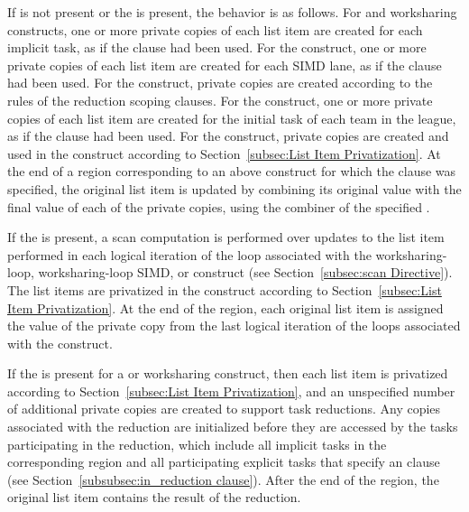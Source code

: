 If  is not present or the 
 is present, the behavior is
as follows. For  and worksharing constructs, one or more
private copies of each list item are created for each implicit task, as if the
 clause had been used. For the  construct, one or
more private copies of each list item are created for each SIMD lane, as if the
 clause had been used.  For the  construct,
private copies are created according to the rules of the reduction scoping
clauses.  For the  construct, one or more private copies of each
list item are created for the initial task of each team in the league, as if
the  clause had been used. For the  construct,
private copies are created and used in the construct according to
Section~\ref{subsec:List Item Privatization}. At the end of a region
corresponding to an above construct for which the  clause was
specified, the original list item is updated by combining its original value
with the final value of each of the private copies, using the combiner of the
specified . 

If the   is present, a scan computation is
performed over updates to the list item performed in each logical iteration of
the loop associated with the worksharing-loop, worksharing-loop SIMD, or
 construct (see Section~\ref{subsec:scan Directive}). The list
items are privatized in the construct according to Section~\ref{subsec:List
Item Privatization}.  At the end of the region, each original list item is
assigned the value of the private copy from the last logical iteration of the
loops associated with the construct.

If the   is present for a 
or worksharing construct, then each list item is privatized according to
Section~\ref{subsec:List Item Privatization}, and an unspecified number of
additional private copies are created to support task reductions.  Any copies
associated with the reduction are initialized before they are accessed by the
tasks participating in the reduction, which include all implicit tasks in the
corresponding region and all participating explicit tasks that specify an
 clause (see Section~\ref{subsubsec:in_reduction clause}).
After the end of the region, the original list item contains the result of the
reduction.

